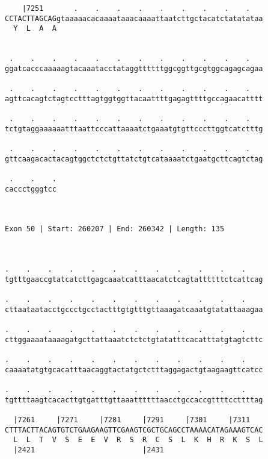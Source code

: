 \documentclass{article}
\begin{document}
\begin{Verbatim}
    |7251       .    .    .    .    .    .    .    .    .   
CCTACTTAGCAGgtaaaaacacaaaataaacaaaattaatcttgctacatctatatataa
  Y  L  A  A                                                
                                                            
  
 .    .    .    .    .    .    .    .    .    .    .    .   
ggatcacccaaaaagtacaaatacctataggttttttggcggttgcgtggcagagcagaa
                                                            
 .    .    .    .    .    .    .    .    .    .    .    .   
agttcacagtctagtcctttagtggtggttacaattttgagagttttgccagaacatttt
                                                            
 .    .    .    .    .    .    .    .    .    .    .    .   
tctgtaggaaaaaatttaattcccattaaaatctgaaatgtgttcccttggtcatctttg
                                                            
 .    .    .    .    .    .    .    .    .    .    .    .   
gttcaagacactacagtggctctctgttatctgtcataaaatctgaatgcttcagtctag
                                                            
 .    .    .
caccctgggtcc
            
            
 
Exon 50 | Start: 260207 | End: 260342 | Length: 135



.    .    .    .    .    .    .    .    .    .    .    .    
tgtttgaaccgtatcatcttgagcaaatcatttaacatctcagtattttttctcattcag
                                                            
.    .    .    .    .    .    .    .    .    .    .    .    
cttaataatacctgccctgcctactttgtgtttgttaaagatcaaatgtatattaaagaa
                                                            
.    .    .    .    .    .    .    .    .    .    .    .    
cttggaaaataaaagatgcttattaaatctctctgtatatttcacatttatgtagtcttc
                                                            
.    .    .    .    .    .    .    .    .    .    .    .    
caaaatatgtgcacatttaacaggtactatgctctttaggagactgtaagaagttcatcc
                                                            
.    .    .    .    .    .    .    .    .    .    .    .    
tgttttaagtcacacttgtgatttgttaaattttttaacctgccaccgttttccttttag
                                                            
  |7261     |7271     |7281     |7291     |7301     |7311   
CTTTACTTACAGTGTCTGAAGAAGTTCGAAGTCGCTGCAGCCTAAAACATAGAAAGTCAC
  L  L  T  V  S  E  E  V  R  S  R  C  S  L  K  H  R  K  S  L
  |2421                         |2431                       
  

\end{Verbatim}
\end{document}
